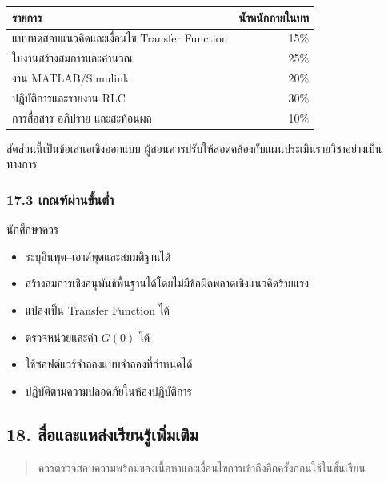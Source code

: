\begin{table}[htbp]
    \centering
    \begin{tabular}{l r}
        \hline
        \textbf{รายการ} & \textbf{น้ำหนักภายในบท} \\
        \hline
        แบบทดสอบแนวคิดและเงื่อนไข Transfer Function & 15\% \\
        ใบงานสร้างสมการและคำนวณ & 25\% \\
        งาน MATLAB/Simulink & 20\% \\
        ปฏิบัติการและรายงาน RLC & 30\% \\
        การสื่อสาร อภิปราย และสะท้อนผล & 10\% \\
        \hline
    \end{tabular}
\end{table}

สัดส่วนนี้เป็นข้อเสนอเชิงออกแบบ ผู้สอนควรปรับให้สอดคล้องกับแผนประเมินรายวิชาอย่างเป็นทางการ

\subsubsection{17.3 เกณฑ์ผ่านขั้นต่ำ}

นักศึกษาควร

\begin{itemize}
    \item ระบุอินพุต–เอาต์พุตและสมมติฐานได้
    \item สร้างสมการเชิงอนุพันธ์พื้นฐานได้โดยไม่มีข้อผิดพลาดเชิงแนวคิดร้ายแรง
    \item แปลงเป็น Transfer Function ได้
    \item ตรวจหน่วยและค่า $G(0)$ ได้
    \item ใช้ซอฟต์แวร์จำลองแบบจำลองที่กำหนดได้
    \item ปฏิบัติตามความปลอดภัยในห้องปฏิบัติการ
\end{itemize}


\subsection{18. สื่อและแหล่งเรียนรู้เพิ่มเติม}

\begin{quote}
ควรตรวจสอบความพร้อมของเนื้อหาและเงื่อนไขการเข้าถึงอีกครั้งก่อนใช้ในชั้นเรียน
\end{quote}

